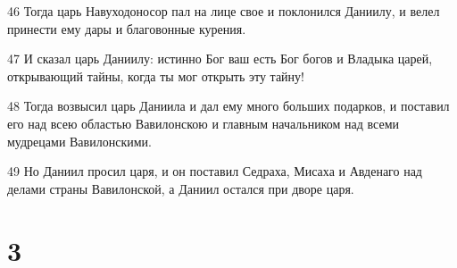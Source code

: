 \par 46 Тогда царь Навуходоносор пал на лице свое и поклонился Даниилу, и велел принести ему дары и благовонные курения.
\par 47 И сказал царь Даниилу: истинно Бог ваш есть Бог богов и Владыка царей, открывающий тайны, когда ты мог открыть эту тайну!
\par 48 Тогда возвысил царь Даниила и дал ему много больших подарков, и поставил его над всею областью Вавилонскою и главным начальником над всеми мудрецами Вавилонскими.
\par 49 Но Даниил просил царя, и он поставил Седраха, Мисаха и Авденаго над делами страны Вавилонской, а Даниил остался при дворе царя.

\chapter{3}

